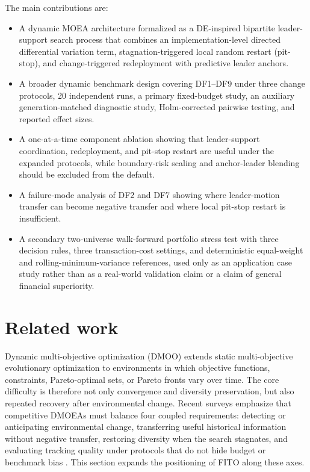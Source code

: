 \documentclass[preprint,12pt]{elsarticle}
\begin{document}
The main contributions are:
\begin{itemize}
    \item A dynamic MOEA architecture formalized as a DE-inspired bipartite leader-support search process that combines an implementation-level directed differential variation term, stagnation-triggered local random restart (pit-stop), and change-triggered redeployment with predictive leader anchors.
    \item A broader dynamic benchmark design covering DF1--DF9 under three change protocols, 20 independent runs, a primary fixed-budget study, an auxiliary generation-matched diagnostic study, Holm-corrected pairwise testing, and reported effect sizes.
    \item A one-at-a-time component ablation showing that leader-support coordination, redeployment, and pit-stop restart are useful under the expanded protocols, while boundary-risk scaling and anchor-leader blending should be excluded from the default.
    \item A failure-mode analysis of DF2 and DF7 showing where leader-motion transfer can become negative transfer and where local pit-stop restart is insufficient.
    \item A secondary two-universe walk-forward portfolio stress test with three decision rules, three transaction-cost settings, and deterministic equal-weight and rolling-minimum-variance references, used only as an application case study rather than as a real-world validation claim or a claim of general financial superiority.
\end{itemize}

\section{Related work}
\label{sec:related}

Dynamic multi-objective optimization (DMOO) extends static multi-objective evolutionary optimization to environments in which objective functions, constraints, Pareto-optimal sets, or Pareto fronts vary over time. The core difficulty is therefore not only convergence and diversity preservation, but also repeated recovery after environmental change. Recent surveys emphasize that competitive DMOEAs must balance four coupled requirements: detecting or anticipating environmental change, transferring useful historical information without negative transfer, restoring diversity when the search stagnates, and evaluating tracking quality under protocols that do not hide budget or benchmark bias \cite{Azzouz2017Survey,Jiang2022Survey,Shao2026Benchmark}. This section expands the positioning of FITO along these axes.
\end{document}

